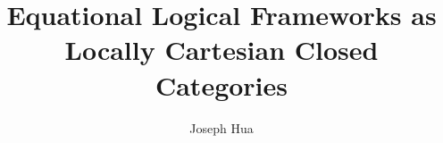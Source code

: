\documentclass{article}
\newcommand{\<}{\langle}
\renewcommand{\>}{\rangle}
\theoremstyle{definitionstyle}
\theoremstyle{exercisestyle}
\theoremstyle{remarkstyle}
\begin{document}
\title{Equational Logical Frameworks as Locally Cartesian Closed Categories}
\author{Joseph Hua}
\maketitle

\tableofcontents









{}

\end{document}
